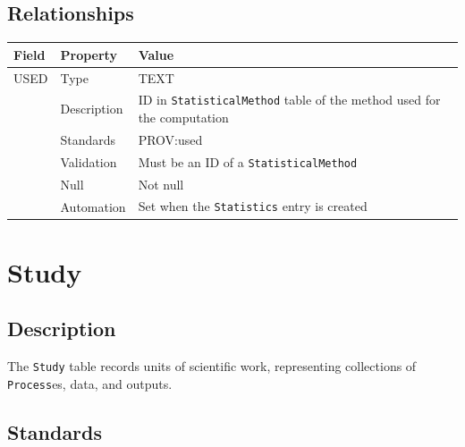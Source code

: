 \documentclass[
]{article}
\newcounter{none} %
\begin{document}
\subsection{Relationships}\label{relationships-27}

{\def\LTcaptype{none} %
\begin{longtable}[]{@{}
  >{\raggedright\arraybackslash}p{}
  >{\raggedright\arraybackslash}p{}
  >{\raggedright\arraybackslash}p{}@{}}
\toprule\noalign{}
\begin{minipage}[b]{\linewidth}\raggedright
Field
\end{minipage} & \begin{minipage}[b]{\linewidth}\raggedright
Property
\end{minipage} & \begin{minipage}[b]{\linewidth}\raggedright
Value
\end{minipage} \\
\midrule\noalign{}
\endhead
\bottomrule\noalign{}
\endlastfoot
USED & Type & TEXT \\
& Description & ID in \texttt{StatisticalMethod} table of the method
used for the computation \\
& Standards & PROV:used \\
& Validation & Must be an ID of a \texttt{StatisticalMethod} \\
& Null & Not null \\
& Automation & Set when the \texttt{Statistics} entry is created \\
\end{longtable}
}

\section{Study}\label{study}

\subsection{Description}\label{description-32}

The \texttt{Study} table records units of scientific work, representing
collections of \texttt{Process}es, data, and outputs.

\subsection{Standards}\label{standards-34}
\end{document}
